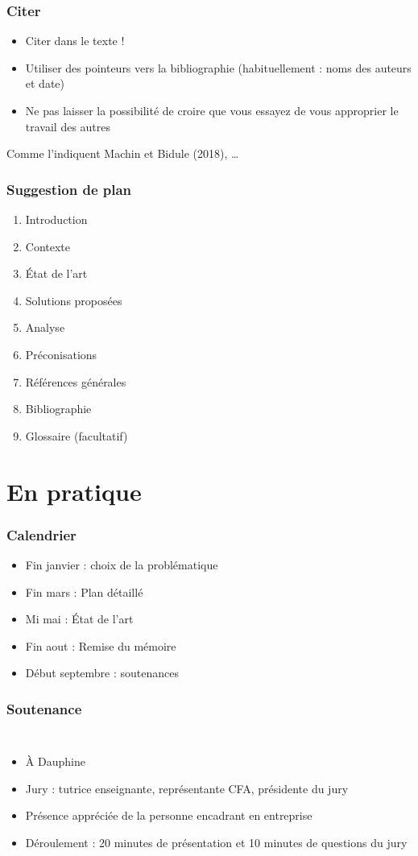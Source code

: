 \documentclass[french]{beamer}
\begin{document}
\begin{frame}
	\frametitle{Citer}
	\begin{itemize}
		\item Citer dans le texte !
		\item Utiliser des pointeurs vers la bibliographie (habituellement : noms des auteurs et date)
		\item Ne pas laisser la possibilité de croire que vous essayez de vous approprier le travail des autres
	\end{itemize}
	\begin{example}[Pointeur]
		Comme l’indiquent Machin et Bidule (2018), …
	\end{example}
\end{frame}

\begin{frame}
	\frametitle{Suggestion de plan}
	\begin{enumerate}
		\item Introduction
		\item Contexte
		\item État de l’art
		\item Solutions proposées
		\item Analyse
		\item Préconisations
		\item Références générales
		\item Bibliographie
		\item Glossaire (facultatif)
	\end{enumerate}
\end{frame}

\section{En pratique}
\begin{frame}
	\frametitle{Calendrier}
	\begin{itemize}
		\item Fin janvier : choix de la problématique
		\item Fin mars : Plan détaillé
		\item Mi mai : État de l’art
		\item Fin aout : Remise du mémoire
		\item Début septembre : soutenances
	\end{itemize}
\end{frame}

\begin{frame}
	\frametitle{Soutenance}
  \begin{columns}
    \column{\dimexpr\textwidth+1mm}
		\begin{itemize}
			\item À Dauphine
			\item Jury : tutrice enseignante, représentante CFA, présidente du jury
			\item Présence appréciée de la personne encadrant en entreprise
			\item Déroulement : 20 minutes de présentation et 10 minutes de questions du jury
		\end{itemize}
		\end{columns}
\end{frame}
\end{document}
